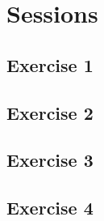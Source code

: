 \chapter{Sessions}
\graphicspath{{4-sessions/images/}}

\section{Exercise 1}
\section{Exercise 2}
\section{Exercise 3}
\section{Exercise 4}
